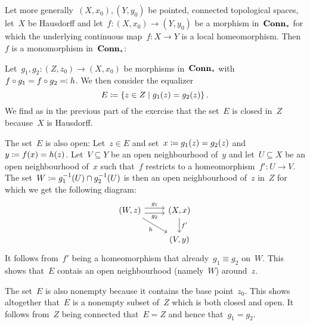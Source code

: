 \subsection{}

Let more generally~$(X,x_0), (Y,y_0)$ be pointed, connected topological spaces, let~$X$ be Hausdorff and let~$f \colon (X,x_0) \to (Y,y_0)$ be a morphism in~$\mathbf{Conn}_*$ for which the underlying continuous map~$f \colon X \to Y$ is a local homeomorphism.
Then~$f$ is a monomorphism in~$\mathbf{Conn}_*$:

Let~$g_1, g_2 \colon (Z,z_0) \to (X,x_0)$ be morphisms in~$\mathbf{Conn}_*$ with~$f \circ g_1 = f \circ g_2 \eqqcolon h$.
We then consider the equalizer
\[
            E
  \defined  \{
              z \in Z
            \suchthat
              g_1(z) = g_2(z)
            \} \,.
\]
We find as in the previous part of the exercise that the set~$E$ is closed in~$Z$ because~$X$ is Hausdorff.

The set~$E$ is also open:
Let~$z \in E$ and set~$x \coloneqq g_1(z) = g_2(z)$ and~$y \coloneqq f(x) = h(z)$.
Let~$V \subseteq Y$ be an open neighbourhood of~$y$ and let~$U \subseteq X$ be an open neighbourhood of~$x$ such that~$f$ restricts to a homeomorphism~$f' \colon U \to V$.
The set~$W \coloneqq g_1^{-1}(U) \cap g_2^{-1}(U)$ is then an open neighbourhood of~$z$ in~$Z$ for which we get the following diagram:
\[
  \begin{tikzcd}
      (W,z)
      \arrow[yshift=0.3em]{r}[above]{g_1}
      \arrow[yshift=-0.3em]{r}[below]{g_2}
      \arrow{dr}[below left]{h}
    & (X,x)
      \arrow{d}[right]{f'}
    \\
      {}
    & (V,y)
  \end{tikzcd}
\]
It follows from~$f'$ being a homeomorphism that already~$g_1 \equiv g_2$ on~$W$.
This shows that~$E$ contais an open neighbourhood (namely~$W$) around~$z$.

The set~$E$ is also nonempty because it contains the base point~$z_0$.
This shows altogether that~$E$ is a nonempty subset of~$Z$ which is both closed and open.
It follows from~$Z$ being connected that~$E = Z$ and hence that~$g_1 = g_2$.







